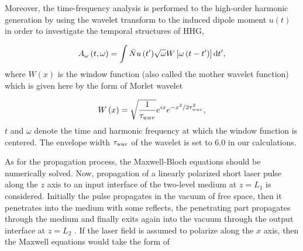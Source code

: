 \documentclass[10pt,letterpaper]{article}
\begin{document}
Moreover, the time-frequency analysis is performed to the high-order harmonic generation by using the wavelet transform to the induced dipole moment ${u}\left( t \right)$ in order to investigate the temporal structures of HHG,

\begin{equation}
{A_\omega }\left( {t,\omega } \right) = \int {\bar{N}{u}\left( {t'} \right)} \sqrt \omega  {W}\left[ {\omega \left( {t - t'} \right)} \right]{\rm{d}}t',
\label{eq8}
\end{equation}
where  $ {W}(x) $ is the window function (also called the mother wavelet function) which is given here by the form of Morlet wavelet \cite{CuiNi2010NJP-wavelet,MyOE2013,TongXiaoMin2000PRA-Wavelet}

\begin{equation}
{{W}}\left( x \right) = \sqrt {\frac{{\rm{1}}}{{{\tau _{wav}}}}} {e^{ix}}{e^{ - {x^2}/2\tau _{wav}^2}},
\label{eq9}
\end{equation}
$ t $ and $ \omega $ denote the time and harmonic frequency at which the window function is centered. The envelope width $ \tau_{\rm{wav}} $ of the wavelet is set to 6.0 in our calculations.

As for the propagation process, the Maxwell-Bloch equations should be numerically solved. Now, propagation of a linearly polarized short laser pulse along the $ z $ axis to an input interface of the two-level medium at $ z=L_{1} $ is considered. Initially the pulse propagates in the vacuum of free space, then it penetrates into the medium with some reflects, the penetrating part propagates through the medium and finally exits again into the vacuum through the output interface at $ z=L_{2} $ \cite{Kalosha-Two-Level-PRL-1999}. If the laser field is assumed to polarize along  the $ x $ axis, then the Maxwell equations would take the form of
\end{document}
